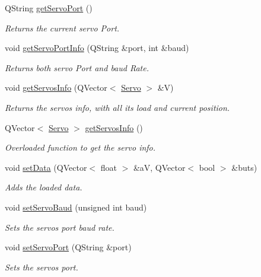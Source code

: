 \begin{DoxyCompactItemize}
Q\+String \hyperlink{class_servo_thread_a3fae25aeac390640192ceb38e32dae40}{get\+Servo\+Port} ()
\begin{DoxyCompactList}\small\item\em Returns the current servo Port. \end{DoxyCompactList}\item 
void \hyperlink{class_servo_thread_afcf834d93f1ac9663d6ebaab820e5f74}{get\+Servo\+Port\+Info} (Q\+String \&port, int \&baud)
\begin{DoxyCompactList}\small\item\em Returns both servo Port and baud Rate. \end{DoxyCompactList}\item 
void \hyperlink{class_servo_thread_a5fd8ef13314428f5ba7646730cc58f1c}{get\+Servos\+Info} (Q\+Vector$<$ \hyperlink{struct_servo_thread_1_1_servo}{Servo} $>$ \&V)
\begin{DoxyCompactList}\small\item\em Returns the servos info, with all its load and current position. \end{DoxyCompactList}\item 
Q\+Vector$<$ \hyperlink{struct_servo_thread_1_1_servo}{Servo} $>$ \hyperlink{class_servo_thread_a3d58189cdeddfb828856f192607f68d2}{get\+Servos\+Info} ()
\begin{DoxyCompactList}\small\item\em Overloaded function to get the servo info. \end{DoxyCompactList}\item 
void \hyperlink{class_servo_thread_a8497ea56991b620981ce1fbf53d9ebdb}{set\+Data} (Q\+Vector$<$ float $>$ \&a\+V, Q\+Vector$<$ bool $>$ \&buts)
\begin{DoxyCompactList}\small\item\em Adds the loaded data. \end{DoxyCompactList}\item 
void \hyperlink{class_servo_thread_a009d3d1b99007b14fadb49996fac49d6}{set\+Servo\+Baud} (unsigned int baud)
\begin{DoxyCompactList}\small\item\em Sets the servos port baud rate. \end{DoxyCompactList}\item 
void \hyperlink{class_servo_thread_a144e31105019d833f59ca2eba012e638}{set\+Servo\+Port} (Q\+String \&port)
\begin{DoxyCompactList}\small\item\em Sets the servos port. \end{DoxyCompactList}\item 

\end{DoxyCompactItemize}
